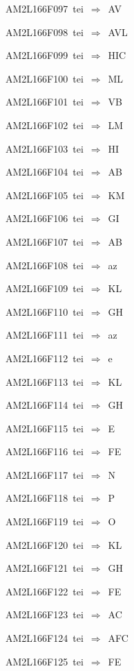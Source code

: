 {\sixrm AM2L166F097\ {\sixit tei}\ }$\Rightarrow$\ AV\par\smallskip
{\sixrm AM2L166F098\ {\sixit tei}\ }$\Rightarrow$\ AVL\par\smallskip
{\sixrm AM2L166F099\ {\sixit tei}\ }$\Rightarrow$\ HIC\par\smallskip
{\sixrm AM2L166F100\ {\sixit tei}\ }$\Rightarrow$\ ML\par\smallskip
{\sixrm AM2L166F101\ {\sixit tei}\ }$\Rightarrow$\ VB\par\smallskip
{\sixrm AM2L166F102\ {\sixit tei}\ }$\Rightarrow$\ LM\par\smallskip
{\sixrm AM2L166F103\ {\sixit tei}\ }$\Rightarrow$\ HI\par\smallskip
{\sixrm AM2L166F104\ {\sixit tei}\ }$\Rightarrow$\ AB\par\smallskip
{\sixrm AM2L166F105\ {\sixit tei}\ }$\Rightarrow$\ KM\par\smallskip
{\sixrm AM2L166F106\ {\sixit tei}\ }$\Rightarrow$\ GI\par\smallskip
{\sixrm AM2L166F107\ {\sixit tei}\ }$\Rightarrow$\ AB\par\smallskip
{\sixrm AM2L166F108\ {\sixit tei}\ }$\Rightarrow$\ {\tenit az}\par\smallskip
{\sixrm AM2L166F109\ {\sixit tei}\ }$\Rightarrow$\ KL\par\smallskip
{\sixrm AM2L166F110\ {\sixit tei}\ }$\Rightarrow$\ GH\par\smallskip
{\sixrm AM2L166F111\ {\sixit tei}\ }$\Rightarrow$\ {\tenit az}\par\smallskip
{\sixrm AM2L166F112\ {\sixit tei}\ }$\Rightarrow$\ {\tenit e}\par\smallskip
{\sixrm AM2L166F113\ {\sixit tei}\ }$\Rightarrow$\ KL\par\smallskip
{\sixrm AM2L166F114\ {\sixit tei}\ }$\Rightarrow$\ GH\par\smallskip
{\sixrm AM2L166F115\ {\sixit tei}\ }$\Rightarrow$\ E\par\smallskip
{\sixrm AM2L166F116\ {\sixit tei}\ }$\Rightarrow$\ FE\par\smallskip
{\sixrm AM2L166F117\ {\sixit tei}\ }$\Rightarrow$\ N\par\smallskip
{\sixrm AM2L166F118\ {\sixit tei}\ }$\Rightarrow$\ P\par\smallskip
{\sixrm AM2L166F119\ {\sixit tei}\ }$\Rightarrow$\ O\par\smallskip
{\sixrm AM2L166F120\ {\sixit tei}\ }$\Rightarrow$\ KL\par\smallskip
{\sixrm AM2L166F121\ {\sixit tei}\ }$\Rightarrow$\ GH\par\smallskip
{\sixrm AM2L166F122\ {\sixit tei}\ }$\Rightarrow$\ FE\par\smallskip
{\sixrm AM2L166F123\ {\sixit tei}\ }$\Rightarrow$\ AC\par\smallskip
{\sixrm AM2L166F124\ {\sixit tei}\ }$\Rightarrow$\ AFC\par\smallskip
{\sixrm AM2L166F125\ {\sixit tei}\ }$\Rightarrow$\ FE\par\smallskip

